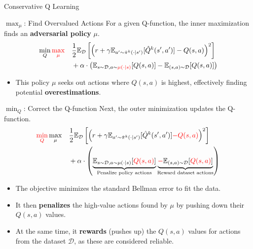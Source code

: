 \documentclass[11pt]{beamer}
\newcommand{\mbb}[1]{\mathbb{#1}}
\newcommand{\mc}[1]{\mathcal{#1}}
\begin{document}
\begin{frame}{Conservative Q Learning}
    \begin{block}{$\max_\mu$: Find Overvalued Actions}
        For a given Q-function, the inner maximization finds an \textbf{adversarial policy} $\mu$.
        \[
        \begin{aligned}
        \min_Q \textcolor{red}{\max_{\mu}} \quad &\frac{1}{2}\mathbb{E}_{\mathcal{D}}\left[\left(r + \gamma \mbb{E}_{a^\prime \sim \hat{\pi}^k (\cdot|s')}[\hat{Q}^k (s', a')] - Q(s,a)\right)^2\right] 
        \\
        &+ \alpha \cdot \left(\mathbb{E}_{s \sim \mc{D}, a \sim \textcolor{red}{\mu(\cdot|s)}}[Q(s,a)] - \mathbb{E}_{(s,a) \sim \mathcal{D}}[Q(s,a)]\right)
        \end{aligned}
        \]
        \begin{itemize}
            \item This policy $\mu$ seeks out actions where $Q(s,a)$ is highest, effectively finding potential \textbf{overestimations}.
        \end{itemize}
    \end{block}

    \begin{block}{$\min_Q$: Correct the Q-function}
        Next, the outer minimization updates the Q-function.
        \[
        \begin{aligned}
        \textcolor{red}{\min_Q} \max_{\mu} \quad &\frac{1}{2}\mathbb{E}_{\mathcal{D}}\left[\left(r + \gamma \mbb{E}_{a^\prime \sim \hat{\pi}^k (\cdot|s')}[\hat{Q}^k (s', a')] \textcolor{red}{- Q(s,a)}\right)^2\right] 
        \\
        &+ \alpha \cdot \left(\underbrace{\mathbb{E}_{s \sim \mc{D}, a \sim \mu(\cdot|s)}[\textcolor{red}{Q(s,a)}]}_{\text{Penalize policy actions}} \underbrace{\textcolor{red}{-} \mathbb{E}_{(s,a) \sim \mathcal{D}}[\textcolor{red}{Q(s,a)}]}_{\text{Reward dataset actions}}\right)
        \end{aligned}
        \]
        \begin{itemize}
            \item The objective minimizes the standard Bellman error to fit the data.
            \item It then \textbf{penalizes} the high-value actions found by $\mu$ by pushing down their $Q(s,a)$ values.
            \item At the same time, it \textbf{rewards} (pushes up) the $Q(s,a)$ values for actions from the dataset $\mathcal{D}$, as these are considered reliable.
        \end{itemize}
    \end{block}
\end{frame}
\end{document}
